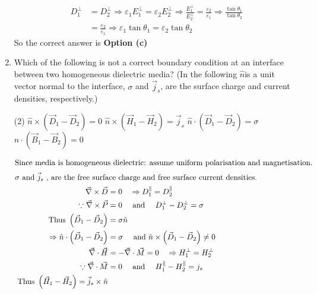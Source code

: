 \begin{enumerate}
\begin{answer}
\begin{align*}
	D_{1}^{\perp}&=D_{2}^{\perp} \Rightarrow \varepsilon_{1} E_{1}^{\perp}=\varepsilon_{2} E_{2}^{\perp} \Rightarrow \frac{E_{1}^{\perp}}{E_{2}^{\perp}}=\frac{\varepsilon_{2}}{\varepsilon_{1}} \Rightarrow \frac{\tan \theta_{1}}{\tan \theta_{2}}\\&=\frac{\varepsilon_{2}}{\varepsilon_{1}} \Rightarrow \varepsilon_{1} \tan \theta_{1}=\varepsilon_{2} \tan \theta_{2}
	\end{align*}
	So the correct answer is \textbf{Option (c)}
\end{answer}
	\item Which of the following is not a correct boundary condition at an interface between two homogeneous dielectric media? (In the following $\hat{n}$is a unit vector normal to the  interface, $\sigma$ and $\vec{j}_s$, are the surface charge and current densities, respectively.)
	{}
	\begin{tasks}(2)
		\task[\textbf{a.}] $\hat{n} \times\left(\vec{D}_{1}-\vec{D}_{2}\right)=0$
		\task[\textbf{b.}] $\hat{n} \times\left(\vec{H}_{1}-\vec{H}_{2}\right)=\vec{j}_{s}$
		\task[\textbf{c.}] $\hat{n} \cdot\left(\vec{D}_{1}-\vec{D}_{2}\right)=\sigma$
		\task[\textbf{d.}] $\hat{n} \cdot\left(\vec{B}_{1}-\vec{B}_{2}\right)=0$
	\end{tasks}
\begin{answer}
	\begin{align*}
	\intertext{Since media is homogeneous dielectric:
		assume uniform polarisation and
		magnetisation.}
	\intertext{$\sigma$ and $\vec{j }_s$ , are the free surface charge and free surface current densities.}
	\vec{\nabla} \times \vec{D}&=0 \quad \Rightarrow D_{1}^{\|}=D_{2}^{\|} \\ \because \vec{\nabla} \times \vec{P}&=0 \quad\text{ and }\quad D_{1}^{\perp}-D_{2}^{\perp}=\sigma\\
	\text{Thus }\left(\vec{D}_{1}-\vec{D}_{2}\right)&=\sigma \hat{n}\\
	\Rightarrow \hat{n} \cdot\left(\vec{D}_{1}-\vec{D}_{2}\right)&=\sigma \quad\text{ and } \hat{n} \times\left(\vec{D}_{1}-\vec{D}_{2}\right) \neq 0\\
	\vec{\nabla} \cdot \vec{H}&=-\vec{\nabla} \cdot \vec{M}=0 \quad \Rightarrow H_{1}^{\perp}=H_{2}^{\perp} \\ \because \vec{\nabla} \cdot \vec{M}&=0 \quad\text{ and } \quad H_{1}^{\|}-H_{2}^{\|}=j_{s}\\
	\text{	Thus }\left(\vec{H}_{1}-\vec{H}_{2}\right)=\vec{j}_{s} \times \hat{n}\\

\end{align*}
\end{answer}
\end{enumerate}

